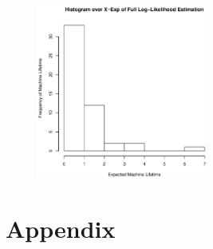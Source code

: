 \documentclass[a4paper, twocolumn]{article}
\begin{document}
    \begin{figure}[h!]
        \centering
        \includegraphics[width=0.5\textwidth]{share/histogram.eps}
    \end{figure}

    \clearpage \nocite{*}
    
    

    \onecolumn \appendix
    \section*{Appendix}

    
    
    
    
    
    
\end{document}
